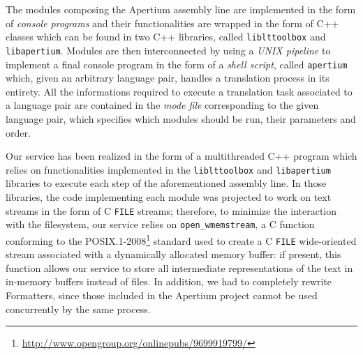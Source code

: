 \documentclass[11pt]{article}
\begin{document}


The modules composing the Apertium assembly line are implemented in the form of \emph{console programs} and their functionalities are wrapped in the form of C++ classes which can be found in two C++ libraries, called {\tt\small liblttoolbox} and {\tt\small libapertium}.
Modules are then interconnected by using a \emph{UNIX pipeline} to implement a final console program in the form of a \emph{shell script}, called {\tt\small apertium} which, given an arbitrary language pair, handles a translation process in its entirety. All the informations required to execute a translation task associated to a language pair are contained in the \emph{mode file} corresponding to the given language pair, which specifies which modules should be run, their parameters and order.

Our service has been realized in the form of a multithreaded C++ program which relies on functionalities implemented in the {\tt\small liblttoolbox} and {\tt\small libapertium} libraries to execute each step of the aforementioned assembly line. In those libraries, the code implementing each module was projected to work on text streams in the form of C {\small\tt FILE} streams; therefore, to minimize the interaction with the filesystem, our service relies on {\small\tt open\_wmemstream}, a C function conforming to the POSIX.1-2008\footnote{\small\url{http://www.opengroup.org/onlinepubs/9699919799/}} standard used to create a C {\small\tt FILE} wide-oriented stream associated with a dynamically allocated memory buffer: if present, this function allows our service to store all intermediate representations of the text in in-memory buffers instead of files. In addition, we had to completely rewrite Formatters, since those included in the Apertium project cannot be used concurrently by the same process.
\end{document}
